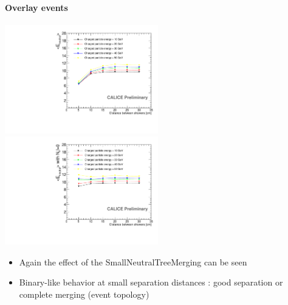 \documentclass[8pt]{beamer}
\begin{document}
  \begin{frame}
  \frametitle{\secname}
  \framesubtitle{Overlay events}
    \begin{center}
      \includegraphics[width=0.5\textwidth]{plots/OverlayEvent_NeutralEnergyMean.pdf}
      \includegraphics[width=0.5\textwidth]{plots/OverlayEvent_NeutralEnergyMeanNeutralEfficient.pdf} \\
      \begin{itemize}
        \item Again the effect of the SmallNeutralTreeMerging can be seen
        \item Binary-like behavior at small separation distances : good separation or complete merging (event topology)
      \end{itemize}

    \end{center}
  \end{frame}
  
\end{document}
